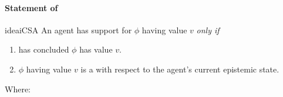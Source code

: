 \paragraph{Statement of \ideaS{}}
\label{sec:ideaS:statement}

\begin{note}
  \begin{restatable}{idea}{iCSA}
    \label{idea:defs-for-CS}
    \label{idea:S}
    An agent \vAgent{} has support for \(\phi\) having value \(v\) \emph{only if}
    \begin{enumerate}
    \item
      \label{idea:S:phi}
      \vAgent{} has concluded \(\phi\) has value \(v\).
    \item
      \label{idea:S:sink}
    \(\phi\) having value \(v\) is a \sink{} with respect to the agent's current epistemic state.
  \end{enumerate}
  \vspace{-\baselineskip}
\end{restatable}

  Where:


\end{note}
